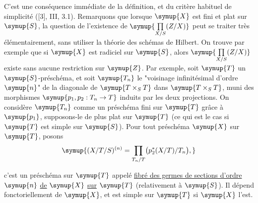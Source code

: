 C'est une conséquence immédiate de la définition, et du critère habituel de
simplicité ([3], III, 3.1). Remarquons que lorsque $\symup{X}$ est fini et plat sur
$\symup{S}$, la question de l'existence de $\symup{\prod\limits_{X/S}(Z/X)}$ peut se traiter très élémentairement, sans
utiliser la théorie des schémas de Hilbert. On trouve par exemple que si $\symup{X}$
est radiciel sur $\symup{S}$, alors $\symup{\prod\limits_{X/S}(Z/X)}$ existe sans aucune restriction sur
$\symup{Z}$. Par exemple, soit $\symup{T}$ un $\symup{S}$-préschéma, et soit $\symup{T_n}$ le "voisinage
infinitésimal d'ordre $\symup{n}$" de la diagonale de $\symup{T\times_ST}$ dans $\symup{T\times_ST}$,
muni des morphismes $\symup{p_1,p_2:T_n\to T}$ induits par les deux
projections. On considère $\symup{T_n}$ comme un préschéma fini sur $\symup{T}$ grâce à $\symup{p_1}$,
supposons-le de plus plat sur $\symup{T}$ (ce qui est le cas si $\symup{T}$ est simple sur $\symup{S}$).
Pour tout préschéma $\symup{X}$ sur $\symup{T}$, posons
\[
\symup{(X/T/S)^{(n)}=
\prod\limits_{T_n/T}\bigl(p_2^*(X/T)/T_n\bigr),}
\]

c'est un préschéma sur $\symup{T}$ appelé \uline{fibré des germes de sections d'ordre}
$\symup{n}$ \uline{de} $\symup{X}$ \uline{sur} $\symup{T}$ (relativement à $\symup{S}$). Il dépend fonctoriellement de $\symup{X}$, et
est simple sur $\symup{T}$ si $\symup{X}$ l'est.



